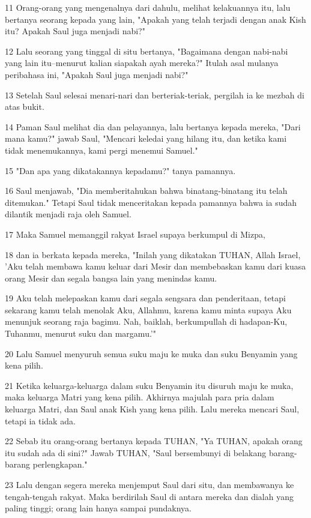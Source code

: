 \par 11 Orang-orang yang mengenalnya dari dahulu, melihat kelakuannya itu, lalu bertanya seorang kepada yang lain, "Apakah yang telah terjadi dengan anak Kish itu? Apakah Saul juga menjadi nabi?"
\par 12 Lalu seorang yang tinggal di situ bertanya, "Bagaimana dengan nabi-nabi yang lain itu--menurut kalian siapakah ayah mereka?" Itulah asal mulanya peribahasa ini, "Apakah Saul juga menjadi nabi?"
\par 13 Setelah Saul selesai menari-nari dan berteriak-teriak, pergilah ia ke mezbah di atas bukit.
\par 14 Paman Saul melihat dia dan pelayannya, lalu bertanya kepada mereka, "Dari mana kamu?" jawab Saul, "Mencari keledai yang hilang itu, dan ketika kami tidak menemukannya, kami pergi menemui Samuel."
\par 15 "Dan apa yang dikatakannya kepadamu?" tanya pamannya.
\par 16 Saul menjawab, "Dia memberitahukan bahwa binatang-binatang itu telah ditemukan." Tetapi Saul tidak menceritakan kepada pamannya bahwa ia sudah dilantik menjadi raja oleh Samuel.
\par 17 Maka Samuel memanggil rakyat Israel supaya berkumpul di Mizpa,
\par 18 dan ia berkata kepada mereka, "Inilah yang dikatakan TUHAN, Allah Israel, 'Aku telah membawa kamu keluar dari Mesir dan membebaskan kamu dari kuasa orang Mesir dan segala bangsa lain yang menindas kamu.
\par 19 Aku telah melepaskan kamu dari segala sengsara dan penderitaan, tetapi sekarang kamu telah menolak Aku, Allahmu, karena kamu minta supaya Aku menunjuk seorang raja bagimu. Nah, baiklah, berkumpullah di hadapan-Ku, Tuhanmu, menurut suku dan margamu.'"
\par 20 Lalu Samuel menyuruh semua suku maju ke muka dan suku Benyamin yang kena pilih.
\par 21 Ketika keluarga-keluarga dalam suku Benyamin itu disuruh maju ke muka, maka keluarga Matri yang kena pilih. Akhirnya majulah para pria dalam keluarga Matri, dan Saul anak Kish yang kena pilih. Lalu mereka mencari Saul, tetapi ia tidak ada.
\par 22 Sebab itu orang-orang bertanya kepada TUHAN, "Ya TUHAN, apakah orang itu sudah ada di sini?" Jawab TUHAN, "Saul bersembunyi di belakang barang-barang perlengkapan."
\par 23 Lalu dengan segera mereka menjemput Saul dari situ, dan membawanya ke tengah-tengah rakyat. Maka berdirilah Saul di antara mereka dan dialah yang paling tinggi; orang lain hanya sampai pundaknya.
